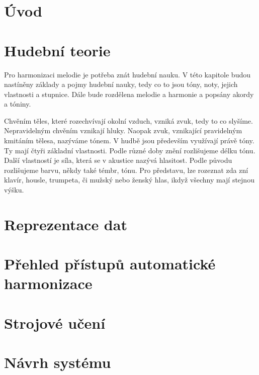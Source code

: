 \chapter{Úvod}
\label{uvod}


\chapter{Hudební teorie}
Pro harmonizaci melodie je potřeba znát hudební nauku. V této kapitole budou nastíněny základy a pojmy hudební nauky, tedy co to jsou tóny, noty, jejich vlastnosti a stupnice. Dále bude rozdělena melodie a harmonie a popsány akordy a tóniny. \par 
Chvěním těles, které rozechvívají okolní vzduch, vzniká zvuk, tedy to co slyšíme. Nepravidelným chvěním vznikají hluky. Naopak zvuk, vznikající pravidelným kmitáním tělesa, nazýváme tónem. V hudbě jsou především využívají právě tóny. Ty mají čtyři základní vlastnosti. Podle různé doby znění rozlišujeme délku tónu. Další vlastností je síla, která se v akustice nazývá hlasitost. Podle původu rozlišujeme barvu, někdy také témbr, tónu. Pro představu, lze rozeznat zda zní klavír, housle, trumpeta, či mužský nebo ženský hlas, ikdyž všechny mají stejnou výšku. \cite{abcZenkl}

\chapter{Reprezentace dat}


\chapter{Přehled přístupů automatické harmonizace}


\chapter{Strojové učení}

\chapter{Návrh systému}

